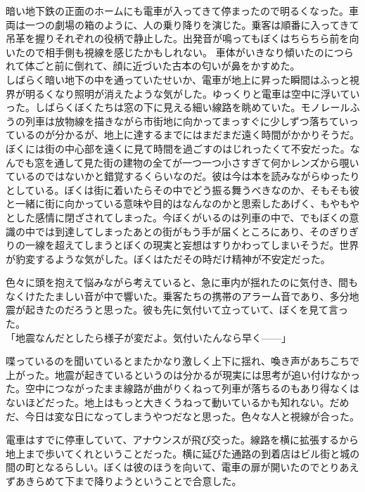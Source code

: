 \documentclass[b5j,twoside,twocolumn]{utarticle}
\begin{document}
暗い地下鉄の正面のホームにも電車が入ってきて停まったので明るくなった。車両は一つの劇場の箱のように、人の乗り降りを演じた。乗客は順番に入ってきて吊革を握りそれぞれの役柄で静止した。出発音が鳴ってもぼくはちらちら前を向いたので相手側も視線を感じたかもしれない。
車体がいきなり傾いたのにつられて体ごと前に倒れて、顔に近づいた古本の匂いが鼻をかすめた。\\



しばらく暗い地下の中を通っていたせいか、電車が地上に昇った瞬間はふっと視界が明るくなり照明が消えたような気がした。ゆっくりと電車は空中に浮いていった。しばらくぼくたちは窓の下に見える細い線路を眺めていた。モノレールふうの列車は放物線を描きながら市街地に向かってまっすぐに少しずつ落ちていっているのが分かるが、地上に達するまでにはまだまだ遠く時間がかかりそうだ。ぼくには街の中心部を遠くに見て時間を過ごすのはじれったくて不安だった。なんでも窓を通して見た街の建物の全てが一つ一つ小さすぎて何かレンズから覗いているのではないかと錯覚するくらいなのだ。彼は今は本を読みながらゆったりとしている。ぼくは街に着いたらその中でどう振る舞うべきなのか、そもそも彼と一緒に街に向かっている意味や目的はなんなのかと思索したあげく、もやもやとした感情に閉ざされてしまった。今ぼくがいるのは列車の中で、でもぼくの意識の中では到達してしまったあとの街がもう手が届くところにあり、そのぎりぎりの一線を超えてしまうとぼくの現実と妄想はすりかわってしまいそうだ。世界が豹変するような気がした。ぼくはただその時だけ精神が不安定だった。


色々に頭を抱えて悩みながら考えていると、急に車内が揺れたのに気付き、間もなくけたたましい音が中で響いた。乗客たちの携帯のアラーム音であり、多分地震が起きたのだろうと思った。彼も先に気付いて立っていて、ぼくを見て言った。\\
「地震なんだとしたら様子が変だよ。気付いたんなら早く\tbaselineshift=2.5pt------\tbaselineshift=4.0pt」


喋っているのを聞いているとまたかなり激しく上下に揺れ、喚き声があちこちで上がった。地震が起きているというのは分かるが現実には思考が追い付けなかった。空中につながったまま線路が曲がりくねって列車が落ちるのもあり得なくはないほどだった。地上はもっと大きくうねって動いているかも知れない。だめだ、今日は変な日になってしまうやつだなと思った。色々な人と視線が合った。


電車はすでに停車していて、アナウンスが飛び交った。線路を横に拡張するから地上まで歩いてくれということだった。横に延びた通路の到着店はビル街と城の間の町となるらしい。ぼくは彼のほうを向いて、電車の扉が開いたのでとりあえずあきらめて下まで降りようということで合意した。
\end{document}
